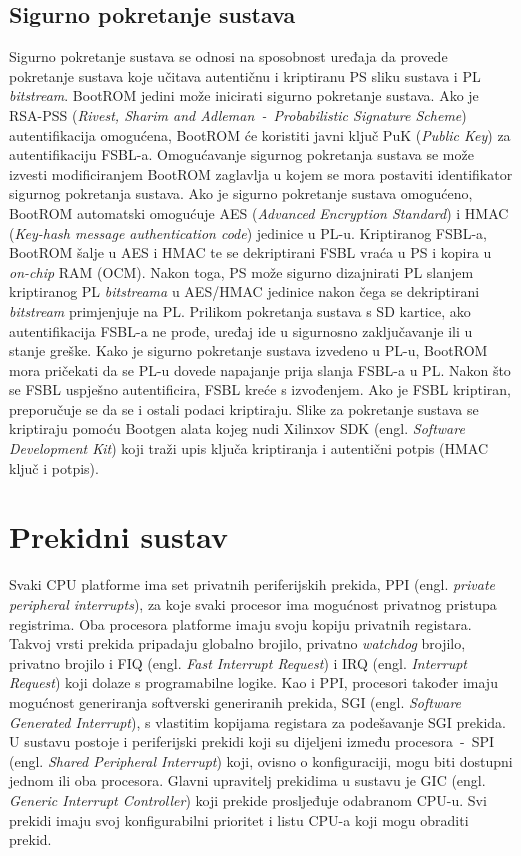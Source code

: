 \documentclass[times, utf8, diplomski, numeric]{fer}
\begin{document}
\subsection{Sigurno pokretanje sustava}
Sigurno pokretanje sustava se odnosi na sposobnost uređaja da provede pokretanje sustava koje učitava autentičnu i
kriptiranu PS sliku sustava i PL \textit{bitstream}. BootROM jedini može inicirati sigurno pokretanje sustava.
Ako je RSA-PSS (\textit{Rivest, Sharim and Adleman~-~Probabilistic Signature Scheme}) autentifikacija  omogućena,
BootROM će koristiti javni ključ PuK (\textit{Public Key}) za autentifikaciju FSBL-a. Omogućavanje sigurnog
pokretanja sustava se može izvesti modificiranjem BootROM zaglavlja u kojem se mora postaviti identifikator sigurnog
pokretanja sustava. Ako je sigurno pokretanje sustava omogućeno, BootROM automatski omogućuje AES (\textit{Advanced
Encryption Standard}) i HMAC (\textit{Key-hash message authentication code}) jedinice u PL-u. Kriptiranog FSBL-a, BootROM
šalje u AES i HMAC te se dekriptirani FSBL vraća u PS i kopira u \textit{on-chip} RAM (OCM). Nakon toga, PS može sigurno
dizajnirati PL slanjem kriptiranog PL \textit{bitstreama} u AES/HMAC jedinice nakon čega se dekriptirani
\textit{bitstream} primjenjuje na PL.
Prilikom pokretanja sustava s SD kartice, ako autentifikacija FSBL-a ne prođe, uređaj ide u sigurnosno zaključavanje
ili u stanje greške. Kako je sigurno pokretanje sustava izvedeno u PL-u, BootROM mora pričekati da se PL-u dovede napajanje
prija slanja FSBL-a u PL. Nakon što se FSBL uspješno autentificira, FSBL kreće s izvođenjem. Ako je FSBL kriptiran,
preporučuje se da se i ostali podaci kriptiraju. Slike za pokretanje sustava se kriptiraju pomoću Bootgen alata kojeg nudi
Xilinxov SDK (engl. \textit{Software Development Kit}) koji traži upis ključa kriptiranja i autentični potpis (HMAC ključ i
potpis).
\section{Prekidni sustav}
Svaki CPU platforme ima set privatnih periferijskih prekida, PPI (engl. \textit{private peripheral interrupts}),
za koje svaki procesor ima mogućnost privatnog pristupa registrima. Oba procesora platforme imaju svoju kopiju privatnih
registara.
Takvoj vrsti prekida pripadaju globalno brojilo, privatno \textit{watchdog} brojilo, privatno brojilo i FIQ (engl.
\textit{Fast Interrupt Request}) i IRQ (engl. \textit{Interrupt Request}) koji dolaze s programabilne logike.
Kao i PPI, procesori također imaju mogućnost generiranja softverski generiranih prekida, SGI (engl. \textit{Software
Generated Interrupt}), s vlastitim kopijama registara za podešavanje SGI prekida. U sustavu postoje i periferijski prekidi
koji su dijeljeni između procesora~-~SPI (engl. \textit{Shared Peripheral Interrupt}) koji, ovisno o konfiguraciji,
mogu biti dostupni jednom ili oba procesora. Glavni upravitelj prekidima u sustavu je GIC (engl. \textit{Generic
Interrupt Controller}) koji prekide prosljeđuje odabranom CPU-u. Svi prekidi imaju svoj konfigurabilni prioritet
i listu CPU-a koji mogu obraditi prekid.
\end{document}
